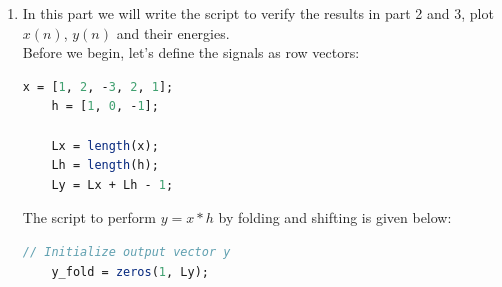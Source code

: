 \documentclass[12pt,a4paper]{article}
\begin{document}
\begin{enumerate}
\begin{equation}
        \begin{bmatrix}
            1&0&0&0&0\\
            0&1&0&0&0\\
            -1&0&1&0&0\\
            0&-1&0&1&0\\
            0&0&-1&0&1\\
            0&0&0&-1&0\\
            0&0&0&0&-1
        \end{bmatrix}\times
        \begin{bmatrix}
            1\\
            2\\
            -3\\
            2\\
            1
        \end{bmatrix}
    \end{equation}
    Each row in \textbf{y} from topdown corresponds to the value of $y(n)$ for $n\in[0,6]$.
    From (\ref{eq:matrix_convo}) we can calculate
    \begin{align*}
        y(0) &= 1\times 1 + 0 +0 +0 +0 = 1\\
        y(1) &= 0 + 1\times2 +0 +0 +0 = 2\\
        y(2) &= (-1)\times 1 + 0 +1\times(-3) +0 +0 = -3 - 1 = -4\\
        y(3) &= 0 + (-1)\times2 +0 +1\times2 +0 = 2 - 2 = 0\\
        y(4) &= 0 + 0 +(-1)\times(-3) +0 +1\times1 = 1 + 3 = 4\\
        y(5) &= 0 + 0 +0 +(-1)\times2 +0 = -2\\
        y(6) &= 0 + 0 +0 +0 +(-1)\times1 = -1
    \end{align*}
    Thus, $y(n)=[1\uparrow,2,-4,0,4,-2,-1]$.
    \item In this part we will write the script to verify the results in part 2 and 3,
    plot $x(n)$, $y(n)$ and their energies.\\[0.5ex]
    Before we begin, let's define the signals as row vectors:
    \begin{lstlisting}[language=Scilab]
    x = [1, 2, -3, 2, 1];
    h = [1, 0, -1];
        
    Lx = length(x);
    Lh = length(h);
    Ly = Lx + Lh - 1;
\end{lstlisting}
    The script to perform $y=x*h$ by folding and shifting is given below:
    \begin{lstlisting}[language=Scilab]
    // Initialize output vector y
    y_fold = zeros(1, Ly);
        

\end{lstlisting}
\end{enumerate}
\end{document}
